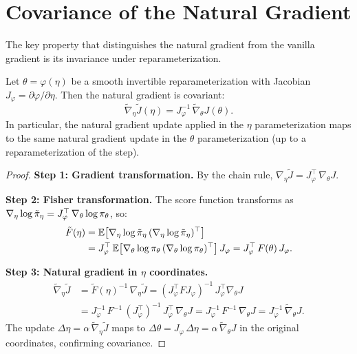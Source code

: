 \documentclass[11pt,a4paper]{article}
\begin{document}
\section{Covariance of the Natural Gradient}

The key property that distinguishes the natural gradient from the vanilla
gradient is its invariance under reparameterization.

\begin{theorem}
\label{thm:covariance}
Let $\theta = \varphi(\eta)$ be a smooth invertible reparameterization
with Jacobian $J_\varphi = \partial\varphi/\partial\eta$. Then the
natural gradient is covariant:
\[
  \tilde{\nabla}_\eta \tilde{J}(\eta)
  = J_\varphi^{-1}\, \tilde{\nabla}_\theta J(\theta).
\]
In particular, the natural gradient update applied in the $\eta$
parameterization maps to the same natural gradient update in the
$\theta$ parameterization (up to a reparameterization of the step).
\end{theorem}

\begin{proof}
\textbf{Step 1: Gradient transformation.}
By the chain rule, $\nabla_\eta \tilde{J} = J_\varphi^\top\,
\nabla_\theta J$.

\textbf{Step 2: Fisher transformation.}
The score function transforms as $\nabla_\eta \log \tilde{\pi}_\eta
= J_\varphi^\top\, \nabla_\theta \log \pi_\theta$, so:
\begin{align*}
  \tilde{F}(\eta) &= \mathbb{E}\!\left[\nabla_\eta \log \tilde{\pi}_\eta\,
    (\nabla_\eta \log \tilde{\pi}_\eta)^\top\right] \\
  &= J_\varphi^\top\, \mathbb{E}\!\left[\nabla_\theta \log \pi_\theta\,
    (\nabla_\theta \log \pi_\theta)^\top\right] J_\varphi
  = J_\varphi^\top\, F(\theta)\, J_\varphi.
\end{align*}

\textbf{Step 3: Natural gradient in $\eta$ coordinates.}
\begin{align*}
  \tilde{\nabla}_\eta \tilde{J}
  &= \tilde{F}(\eta)^{-1}\, \nabla_\eta \tilde{J}
  = (J_\varphi^\top F J_\varphi)^{-1}\, J_\varphi^\top \nabla_\theta J \\
  &= J_\varphi^{-1}\, F^{-1}\, (J_\varphi^\top)^{-1}\,
    J_\varphi^\top\, \nabla_\theta J
  = J_\varphi^{-1}\, F^{-1}\, \nabla_\theta J
  = J_\varphi^{-1}\, \tilde{\nabla}_\theta J.
\end{align*}
The update $\Delta\eta = \alpha\, \tilde{\nabla}_\eta \tilde{J}$
maps to $\Delta\theta = J_\varphi\, \Delta\eta = \alpha\,
\tilde{\nabla}_\theta J$ in the original coordinates, confirming
covariance.
\end{proof}
\end{document}
